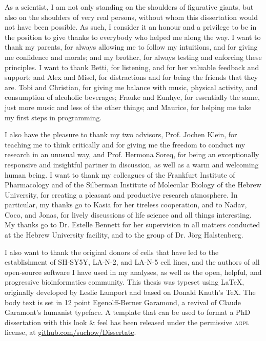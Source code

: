 
As a scientist, I am not only standing on the shoulders of figurative giants, but also on the shoulders of very real persons, without whom this dissertation would not have been possible. As such, I consider it an honour and a privilege to be in the position to give thanks to everybody who helped me along the way. I want to thank my parents, for always allowing me to follow my intuitions, and for giving me confidence and morals; and my brother, for always testing and enforcing these principles. I want to thank Betti, for listening, and for her valuable feedback and support; and Alex and Misel, for distractions and for being the friends that they are. Tobi and Christian, for giving me balance with music, physical activity, and consumption of alcoholic beverages; Frauke and Eunhye, for essentially the same, just more music and less of the other things; and Maurice, for helping me take my first steps in programming.

I also have the pleasure to thank my two advisors, Prof. Jochen Klein, for teaching me to think critically and for giving me the freedom to conduct my research in an unusual way, and Prof. Hermona Soreq, for being an exceptionally responsive and insightful partner in discussion, as well as a warm and welcoming human being. I want to thank my colleagues of the Frankfurt Institute of Pharmacology and of the Silberman Institute of Molecular Biology of the Hebrew University, for creating a pleasant and productive research atmosphere. In particular, my thanks go to Kasia for her tireless cooperation, and to Nadav, Coco, and Jonas, for lively discussions of life science and all things interesting. My thanks go to Dr. Estelle Bennett for her supervision in all matters conducted at the Hebrew University facility, and to the group of Dr. Jörg Halstenberg.

I also want to thank the original donors of cells that have led to the establishment of SH-SY5Y, LA-N-2, and LA-N-5 cell lines, and the authors of all open-source software I have used in my analyses, as well as the open, helpful, and progressive bioinformatics community. This thesis was typeset using \LaTeX, originally developed by Leslie Lamport and based on Donald Knuth's \TeX. The body text is set in 12 point Egenolff-Berner Garamond, a revival of Claude Garamont's humanist typeface. A template that can be used to format a PhD dissertation with this look \& feel has been released under the permissive \textsc{agpl} license, at \href{https://github.com/suchow/Dissertate}{github.com/suchow/Dissertate}.